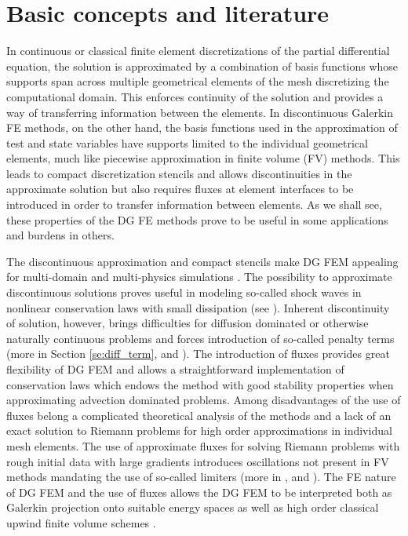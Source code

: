 \section{Basic concepts and literature}
In continuous or classical finite element discretizations of the partial
differential equation, the solution is approximated by a combination of basis
functions whose supports span across multiple geometrical elements of the mesh
discretizing the computational domain. This enforces continuity of the solution
and provides a way of transferring information between the elements. In
discontinuous Galerkin FE methods, on the other hand, the basis functions used
in the approximation of test and state variables have supports limited to the
individual geometrical elements, much like piecewise approximation in finite
volume (FV) methods. This leads to compact discretization stencils and
allows discontinuities in the approximate solution but also requires fluxes at
element interfaces to be introduced in order to transfer information between
elements. As we shall see, these properties of the DG FE methods prove to be
useful in some applications and burdens in others.

The discontinuous approximation and compact stencils make DG FEM appealing for
multi-domain and multi-physics simulations \cite{DiPietro2012}. The possibility to
approximate discontinuous solutions proves useful in modeling so-called shock
waves in nonlinear conservation laws with small dissipation \cite{Kucera}(see
). Inherent discontinuity of solution, however, brings
difficulties for diffusion dominated or otherwise naturally continuous
problems and forces introduction of so-called penalty terms (more in Section
\ref{se:diff_term}, \cite{Antonietti2013} and \cite{Kucera}). The introduction
of fluxes provides great flexibility of DG FEM and allows a straightforward
implementation of conservation laws which endows the method with good stability
properties when approximating advection dominated problems. Among disadvantages of
the use of fluxes belong a complicated theoretical analysis of the methods and
a lack
of an exact solution to Riemann problems for high order approximations in
individual mesh elements. The use of approximate fluxes for solving Riemann
problems with rough initial data with large gradients introduces oscillations
not present in FV methods mandating the use of so-called limiters (more in
, \cite[Sec. 3.2.4]{DiPietro2012} and
\cite{Krivodonova2007}). The FE nature of DG FEM and the use of fluxes allows
the DG FEM to be interpreted both as Galerkin projection onto suitable energy
spaces as well as high order classical upwind finite volume schemes
\cite{Georgoulis2011}.


